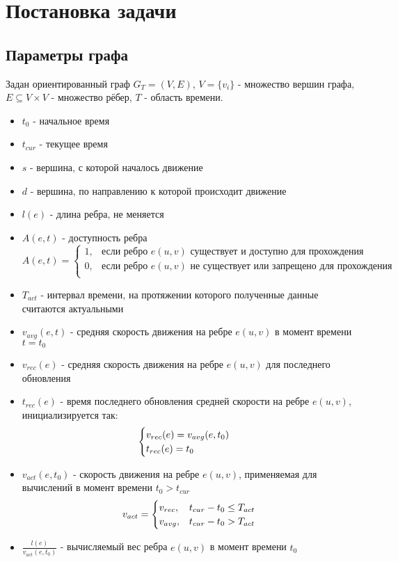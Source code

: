 \documentclass[12pt]{article}
\begin{document}
\section{Постановка задачи}

\subsection{Параметры графа}

Задан ориентированный граф $G_T=(V,E)$, $V = \{v_i\}$ - множество вершин графа, $E \subseteq V \times V$ - множество рёбер, $T$ - область времени.
\begin{itemize}
    \item $t_0$ - начальное время
    \item $t_{cur}$ - текущее время
    \item $s$ - вершина, с которой началось движение
    \item $d$ - вершина, по направлению к которой происходит движение
    \item $l(e)$ - длина ребра, не меняется
    \item $A(e,t)$ - доступность ребра
\[
  A(e,t) =
  \begin{cases}
    1, & \text{если ребро $e(u,v)$ существует и доступно для прохождения} \\
    0, & \text{если ребро $e(u,v)$ не существует или запрещено для прохождения} \\
  \end{cases}
\]
    \item $T_{act}$ - интервал времени, на протяжении которого полученные данные считаются актуальными
    \item $v_{avg}(e,t)$ - средняя скорость движения на ребре $e(u,v)$ в момент времени $t=t_0$
    \item $v_{rec}(e)$ - средняя скорость движения на ребре $e(u,v)$ для последнего обновления
    \item $t_{rec}(e)$ - время последнего обновления средней скорости на ребре $e(u,v)$, инициализируется так:
\[
  \begin{cases}
    $$v_{rec}(e) = v_{avg}(e,t_0)$$ \\
    $$t_{rec}(e) = t_0$$
  \end{cases}
\]
    \item $v_{act}(e, t_0)$ - скорость движения на ребре $e(u,v)$, применяемая для вычислений в момент времени $t_0 > t_{cur}$
\[
  v_{act} =
  \begin{cases}
    $$v_{rec},$$ & \text{$t_{cur} - t_0 \leq T_{act}$} \\
    $$v_{avg},$$ & \text{$t_{cur} - t_0 > T_{act}$} \\
  \end{cases}
\]
    \item $\frac{l(e)}{v_{act}(e,t_0)}$ - вычисляемый вес ребра $e(u,v)$ в момент времени $t_0$

\end{itemize}
\end{document}
